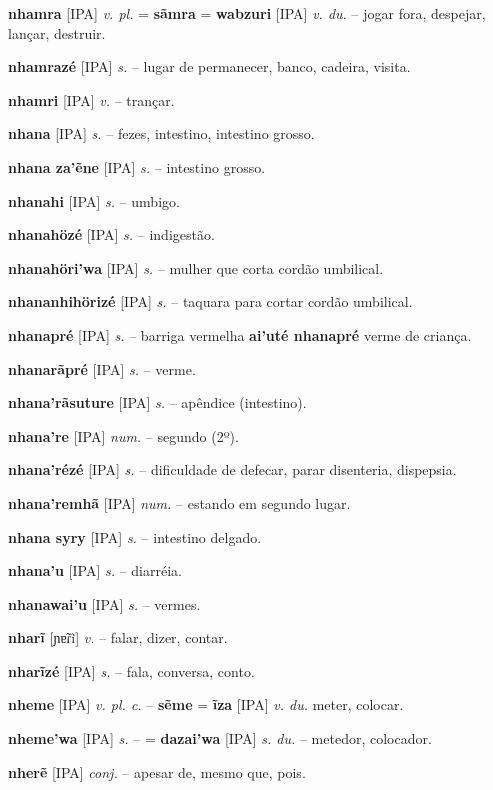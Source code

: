 \textbf{nhamra} [IPA] \textit{v. pl.} = \textbf{sãmra} = \textbf{wabzuri} [IPA] \textit{v. du.} -- jogar fora, despejar, lançar, destruir.

\textbf{nhamrazé} [IPA] \textit{s.} -- lugar de permanecer, banco, cadeira, visita.

\textbf{nhamri} [IPA] \textit{v.} -- trançar.

\textbf{nhana} [IPA] \textit{s.} -- fezes, intestino, intestino grosso.

\textbf{nhana za'ẽne} [IPA] \textit{s.} -- intestino grosso.

\textbf{nhanahi} [IPA] \textit{s.} -- umbigo.

\textbf{nhanahözé} [IPA] \textit{s.} -- indigestão.

\textbf{nhanahöri'wa} [IPA] \textit{s.} -- mulher que corta cordão umbilical.

\textbf{nhananhihörizé} [IPA] \textit{s.} -- taquara para cortar cordão umbilical.

\textbf{nhanapré} [IPA] \textit{s.} -- barriga vermelha  \textbf{ai'uté nhanapré} verme de criança.

\textbf{nhanarãpré} [IPA] \textit{s.} -- verme.

\textbf{nhana'rãsuture} [IPA] \textit{s.} -- apêndice (intestino).

\textbf{nhana're} [IPA] \textit{num.} -- segundo (2º).

\textbf{nhana'rézé} [IPA] \textit{s.} -- dificuldade de defecar, parar disenteria, dispepsia.

\textbf{nhana'remhã} [IPA] \textit{num.} -- estando em segundo lugar.

\textbf{nhana syry} [IPA] \textit{s.} -- intestino delgado.

\textbf{nhana'u} [IPA] \textit{s.} -- diarréia.

\textbf{nhanawai'u} [IPA] \textit{s.} -- vermes.

\textbf{nharĩ} [ɲɐ̃ɾĩ] \textit{v.} -- falar, dizer, contar.

\textbf{nharĩzé} [IPA] \textit{s.} -- fala, conversa, conto.

\textbf{nheme} [IPA] \textit{v. pl. c.} -- \textbf{sẽme} = \textbf{ĩza} [IPA] \textit{v. du.} meter, colocar.

\textbf{nheme'wa} [IPA] \textit{s.} -- = \textbf{dazai'wa} [IPA] \textit{s. du.} -- metedor, colocador.

\textbf{nherẽ} [IPA] \textit{conj.} -- apesar de, mesmo que, pois.

